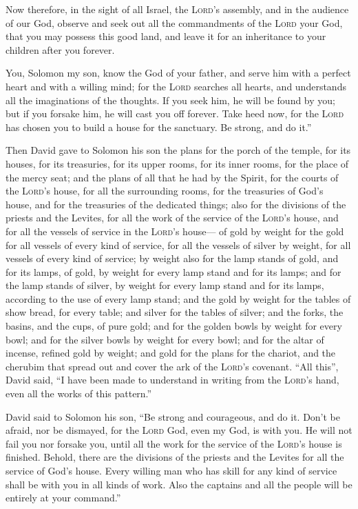  Now therefore, in the sight of all Israel, the
\textsc{Lord}'s assembly, and in the audience of our God, observe and
seek out all the commandments of the \textsc{Lord} your God, that you
may possess this good land, and leave it for an inheritance to your
children after you forever.

 You, Solomon my son, know the God of your father, and
serve him with a perfect heart and with a willing mind; for the
\textsc{Lord} searches all hearts, and understands all the imaginations
of the thoughts. If you seek him, he will be found by you; but if you
forsake him, he will cast you off forever.  Take heed
now, for the \textsc{Lord} has chosen you to build a house for the
sanctuary. Be strong, and do it.''

 Then David gave to Solomon his son the plans for the
porch of the temple, for its houses, for its treasuries, for its upper
rooms, for its inner rooms, for the place of the mercy seat;
 and the plans of all that he had by the Spirit, for the
courts of the \textsc{Lord}'s house, for all the surrounding rooms, for
the treasuries of God's house, and for the treasuries of the dedicated
things;  also for the divisions of the priests and the
Levites, for all the work of the service of the \textsc{Lord}'s house,
and for all the vessels of service in the \textsc{Lord}'s house---
 of gold by weight for the gold for all vessels of every
kind of service, for all the vessels of silver by weight, for all
vessels of every kind of service;  by weight also for the
lamp stands of gold, and for its lamps, of gold, by weight for every
lamp stand and for its lamps; and for the lamp stands of silver, by
weight for every lamp stand and for its lamps, according to the use of
every lamp stand;  and the gold by weight for the tables
of show bread, for every table; and silver for the tables of silver;
 and the forks, the basins, and the cups, of pure gold;
and for the golden bowls by weight for every bowl; and for the silver
bowls by weight for every bowl;  and for the altar of
incense, refined gold by weight; and gold for the plans for the chariot,
and the cherubim that spread out and cover the ark of the
\textsc{Lord}'s covenant.  ``All this'', David said, ``I
have been made to understand in writing from the \textsc{Lord}'s hand,
even all the works of this pattern.''

 David said to Solomon his son, ``Be strong and
courageous, and do it. Don't be afraid, nor be dismayed, for the
\textsc{Lord} God, even my God, is with you. He will not fail you nor
forsake you, until all the work for the service of the \textsc{Lord}'s
house is finished.  Behold, there are the divisions of
the priests and the Levites for all the service of God's house. Every
willing man who has skill for any kind of service shall be with you in
all kinds of work. Also the captains and all the people will be entirely
at your command.''

